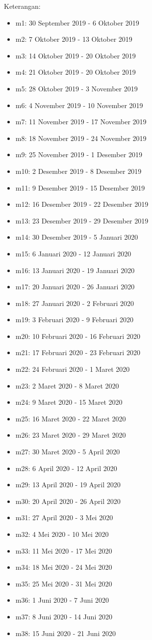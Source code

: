 Keterangan:
\begin{itemize}
  \item m1: 30 September 2019 - 6 Oktober 2019
  \item m2: 7 Oktober 2019 - 13 Oktober 2019
  \item m3: 14 Oktober 2019 - 20 Oktober 2019
  \item m4: 21 Oktober 2019 - 20 Oktober 2019
  \item m5: 28 Oktober 2019 - 3 November 2019
  \item m6: 4 November 2019 - 10 November 2019
  \item m7: 11 November 2019 - 17 November 2019
  \item m8: 18 November 2019 - 24 November 2019
  \item m9: 25 November 2019 - 1 Desember 2019
  \item m10: 2 Desember 2019 - 8 Desember 2019
  \item m11: 9 Desember 2019 - 15 Desember 2019
  \item m12: 16 Desember 2019 - 22 Desember 2019
  \item m13: 23 Desember 2019 - 29 Desember 2019
  \item m14: 30 Desember 2019 - 5 Januari 2020
  \item m15: 6 Januari 2020 - 12 Januari 2020
  \item m16: 13 Januari 2020 - 19 Januari 2020
  \item m17: 20 Januari 2020 - 26 Januari 2020
  \item m18: 27 Januari 2020 - 2 Februari 2020
  \item m19: 3 Februari 2020 - 9 Februari 2020
  \item m20: 10 Februari 2020 - 16 Februari 2020
  \item m21: 17 Februari 2020 - 23 Februari 2020
  \item m22: 24 Februari 2020 - 1 Maret 2020
  \item m23: 2 Maret 2020 - 8 Maret 2020
  \item m24: 9 Maret 2020 - 15 Maret 2020
  \item m25: 16 Maret 2020 - 22 Maret 2020
  \item m26: 23 Maret 2020 - 29 Maret 2020
  \item m27: 30 Maret 2020 - 5 April 2020
  \item m28: 6 April 2020 - 12 April 2020
  \item m29: 13 April 2020 - 19 April 2020
  \item m30: 20 April 2020 - 26 April 2020
  \item m31: 27 April 2020 - 3 Mei 2020
  \item m32: 4 Mei 2020 - 10 Mei 2020
  \item m33: 11 Mei 2020 - 17 Mei 2020
  \item m34: 18 Mei 2020 - 24 Mei 2020
  \item m35: 25 Mei 2020 - 31 Mei 2020
  \item m36: 1 Juni 2020 - 7 Juni 2020
  \item m37: 8 Juni 2020 - 14 Juni 2020
  \item m38: 15 Juni 2020 - 21 Juni 2020
\end{itemize}
